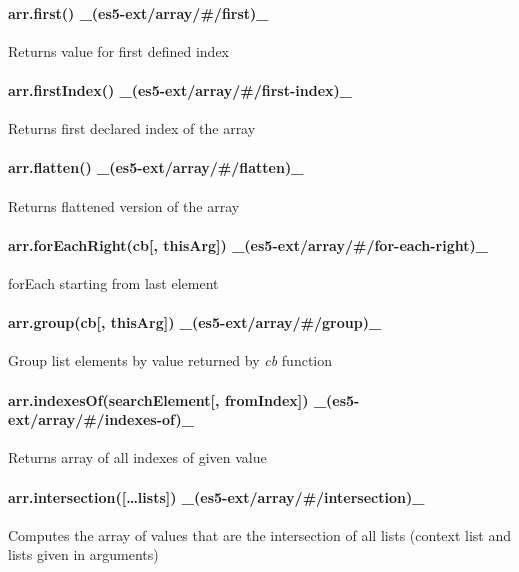 \paragraph*{arr.\+first() \+\_\+(es5-\/ext/array/\#/first)\+\_\+}

Returns value for first defined index

\paragraph*{arr.\+first\+Index() \+\_\+(es5-\/ext/array/\#/first-\/index)\+\_\+}

Returns first declared index of the array

\paragraph*{arr.\+flatten() \+\_\+(es5-\/ext/array/\#/flatten)\+\_\+}

Returns flattened version of the array

\paragraph*{arr.\+for\+Each\+Right(cb\mbox{[}, this\+Arg\mbox{]}) \+\_\+(es5-\/ext/array/\#/for-\/each-\/right)\+\_\+}

{\ttfamily for\+Each} starting from last element

\paragraph*{arr.\+group(cb\mbox{[}, this\+Arg\mbox{]}) \+\_\+(es5-\/ext/array/\#/group)\+\_\+}

Group list elements by value returned by {\itshape cb} function

\paragraph*{arr.\+indexes\+Of(search\+Element\mbox{[}, from\+Index\mbox{]}) \+\_\+(es5-\/ext/array/\#/indexes-\/of)\+\_\+}

Returns array of all indexes of given value

\paragraph*{arr.\+intersection(\mbox{[}…lists\mbox{]}) \+\_\+(es5-\/ext/array/\#/intersection)\+\_\+}

Computes the array of values that are the intersection of all lists (context list and lists given in arguments)

